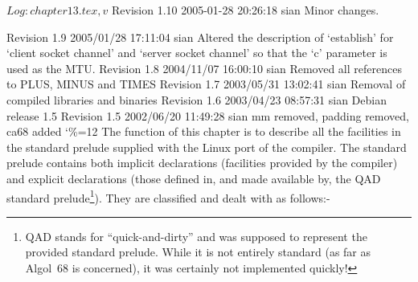  $Log: chapter13.tex,v $
 Revision 1.10  2005-01-28 20:26:18  sian
 Minor changes.

 Revision 1.9  2005/01/28 17:11:04  sian
 Altered the description of `establish' for `client socket channel' and
 `server socket channel' so that the `c' parameter is used as the MTU.
%
 Revision 1.8  2004/11/07 16:00:10  sian
 Removed all references to PLUS, MINUS and TIMES
%
 Revision 1.7  2003/05/31 13:02:41  sian
 Removal of compiled libraries and binaries
%
 Revision 1.6  2003/04/23 08:57:31  sian
 Debian release 1.5
%
 Revision 1.5  2002/06/20 11:49:28  sian
 mm removed, padding removed, ca68 added
%
\catcode`\%=12
The function of this chapter is to describe all the facilities in the
standard prelude supplied with the Linux port of the
compiler. The standard prelude contains both implicit declarations
(facilities provided by the compiler) and explicit declarations
(those defined in, and made available by, the QAD standard
prelude\footnote{QAD stands for ``quick-and-dirty'' and was supposed
to represent the provided standard prelude. While it is not entirely
standard (as far as Algol~68 is concerned), it was certainly not
implemented quickly!}). They are classified and dealt with as follows:-
